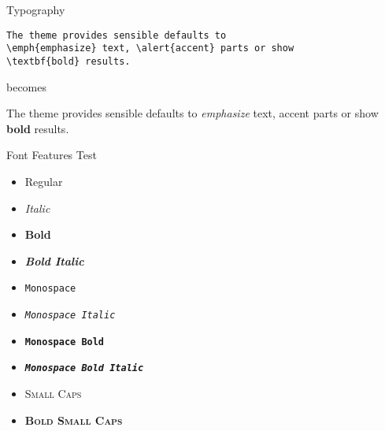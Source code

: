 \documentclass[10pt]{beamer}
\begin{document}
\begin{frame}[fragile]{Typography}
  \begin{verbatim}The theme provides sensible defaults to
\emph{emphasize} text, \alert{accent} parts or show
\textbf{bold} results.\end{verbatim}
  \begin{center}
    becomes
  \end{center}
  The theme provides sensible defaults to \emph{emphasize} text,
  \alert{accent} parts or show \textbf{bold} results.
\end{frame}

\begin{frame}{Font Features Test}
  \begin{itemize}
    \item Regular
    \item \textit{Italic}
    \item \textbf{Bold}
    \item \textbf{\textit{Bold Italic}}
    \item \texttt{Monospace}
    \item \texttt{\textit{Monospace Italic}}
    \item \texttt{\textbf{Monospace Bold}}
    \item \texttt{\textbf{\textit{Monospace Bold Italic}}}
    \item \textsc{Small Caps}
    \item \textbf{\textsc{Bold Small Caps}}
  \end{itemize}
\end{frame}
\end{document}
